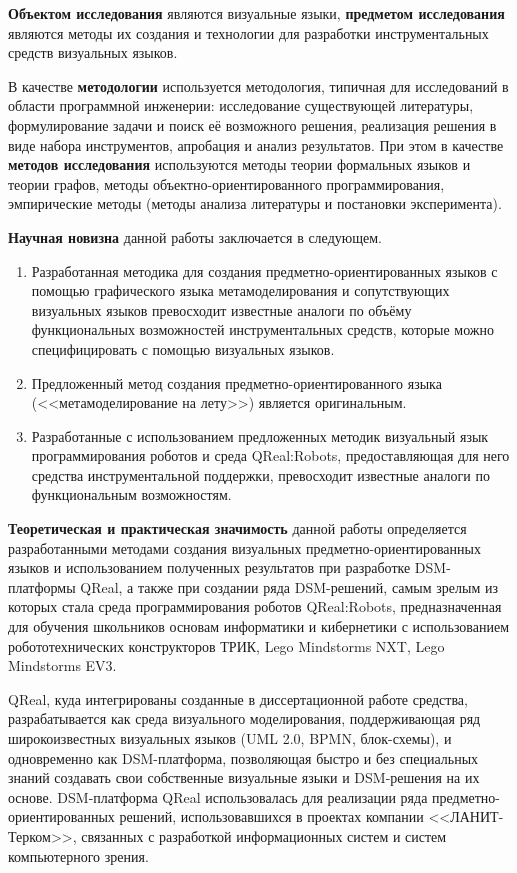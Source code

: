 \textbf{Объектом исследования} являются визуальные языки, \textbf{предметом исследования} 
являются методы их создания и технологии для разработки инструментальных средств визуальных языков.

В качестве \textbf{методологии} используется методология, типичная для исследований в 
области программной инженерии: исследование существующей литературы, формулирование задачи 
и поиск её возможного решения, реализация решения в виде набора инструментов, апробация 
и анализ результатов. При этом в качестве \textbf{методов исследования} используются 
методы теории формальных языков и теории графов, методы объектно-ориентированного программирования, 
эмпирические методы (методы анализа литературы и постановки эксперимента).

\textbf{Научная новизна} данной работы заключается в следующем.
\begin{enumerate}
	\item Разработанная методика для создания предметно-ориентированных языков с помощью 
		графического языка метамоделирования и сопутствующих визуальных языков превосходит 
		известные аналоги по объёму функциональных возможностей инструментальных средств, 
		которые можно специфицировать с помощью визуальных языков.
	\item Предложенный метод создания предметно-ориентированного языка (<<метамоделирование на лету>>)
	является оригинальным. 
	\item Разработанные с использованием предложенных методик визуальный язык программирования роботов 
		и среда QReal:Robots, предоставляющая для него средства инструментальной поддержки, 
		превосходит известные аналоги по функциональным возможностям.
\end{enumerate}

\textbf{Теоретическая и практическая значимость} данной работы определяется разработанными 
методами создания визуальных предметно-ориентированных языков и использованием полученных 
результатов при разработке DSM-платформы QReal, а также при создании ряда DSM-решений, 
самым зрелым из которых стала среда программирования роботов QReal:Robots, 
предназначенная для обучения школьников основам информатики и кибернетики с использованием робототехнических 
конструкторов ТРИК, Lego Mindstorms NXT, Lego Mindstorms EV3.

QReal, куда интегрированы созданные в диссертационной работе средства, разрабатывается 
как среда визуального моделирования, поддерживающая ряд широкоизвестных 
визуальных языков (UML 2.0, BPMN, блок-схемы), и одновременно как DSM-платформа, 
позволяющая быстро и без специальных знаний создавать свои собственные 
визуальные языки и DSM-решения на их основе. DSM-платформа QReal использовалась
для реализации ряда предметно-ориентированных решений, использовавшихся в 
проектах компании <<ЛАНИТ-Терком>>, связанных с разработкой информационных систем 
и систем компьютерного зрения.

